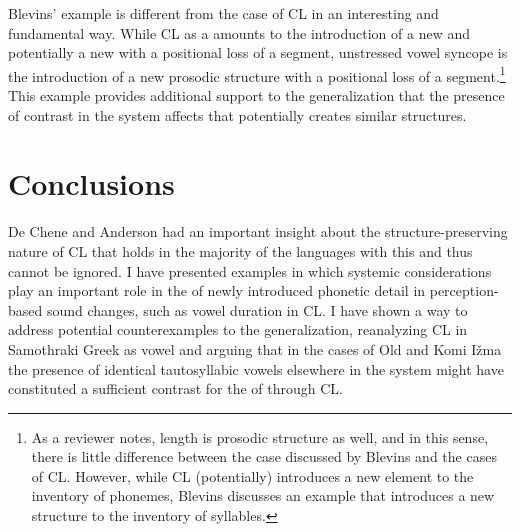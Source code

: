 \documentclass[output=paper,
modfonts
]{LSP/langsci}
\begin{document}
Blevins' \citeyearpar{blevins2009k} example is different from the case of CL in an
interesting and fundamental way. While CL as a  amounts to
the introduction of a new  and potentially a new  with a
positional loss of a segment, unstressed vowel syncope is the
introduction of a new prosodic structure with a positional loss of a
segment.\footnote{As a reviewer notes, length is prosodic structure as
  well, and in this sense, there is little difference between the case
  discussed by Blevins and the cases of CL. However, while CL
  (potentially) introduces a new element to the inventory of phonemes,
  Blevins discusses an example that introduces a new structure to the
  inventory of syllables.} This example provides additional support to
the generalization that the presence of contrast in the system affects
 that potentially creates similar structures.

\section{Conclusions}

De Chene and Anderson \citeyearpar{deChene1979} had an important insight about the
structure-preserving nature of CL that holds in the majority of the
languages with this  and thus cannot be ignored. I have
presented examples in which systemic considerations play an important
role in the  of newly introduced phonetic detail in
perception-based sound changes, such as vowel duration in CL. I have
shown a way to address potential counterexamples to the generalization,
reanalyzing CL in Samothraki Greek as vowel  and arguing that
in the cases of Old  and Komi Ižma the presence of identical
tautosyllabic vowels elsewhere in the system might have constituted a
sufficient contrast for the  of  through
CL.


{\sloppy
\printbibliography[heading=subbibliography,notkeyword=this]
}
\end{document}
